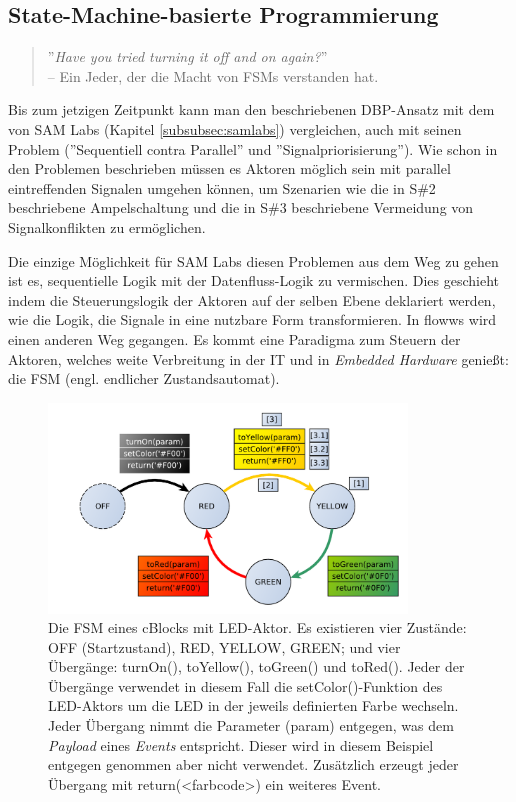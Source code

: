 \subsection{State-Machine-basierte Programmierung}\label{subsec:fsmprogrammierung}
\begin{quote}
    ''\textit{Have you tried turning it off and on again?}''  \\ -- Ein Jeder, der die Macht von \acp{FSM} verstanden hat.
\end{quote}

Bis zum jetzigen Zeitpunkt kann man den beschriebenen \ac{DBP}-Ansatz mit dem von SAM Labs (Kapitel \ref{subsubsec:samlabs}) vergleichen, auch mit seinen Problem (''Sequentiell contra Parallel'' und ''Signalpriorisierung''). Wie schon in den Problemen beschrieben müssen es Aktoren möglich sein mit parallel eintreffenden Signalen umgehen können, um Szenarien wie die in S\#2 beschriebene Ampelschaltung und die in S\#3 beschriebene Vermeidung von Signalkonflikten zu ermöglichen.

Die einzige Möglichkeit für SAM Labs diesen Problemen aus dem Weg zu gehen ist es, sequentielle Logik mit der Datenfluss-Logik zu vermischen. Dies geschieht indem die Steuerungslogik der Aktoren auf der selben Ebene deklariert werden, wie die Logik, die Signale in eine nutzbare Form transformieren. In flowws wird einen anderen Weg gegangen. Es kommt eine Paradigma zum Steuern der Aktoren, welches weite Verbreitung in der IT und in \textit{Embedded Hardware} genießt: die \acl{FSM} (engl. endlicher Zustandsautomat).


\begin{figure}[h]
  \centering
  \includegraphics[width=0.85\textwidth]{bilder/chapter4/chapter4_2/beispielstatemachine.pdf}
  \caption{Die \ac{FSM} eines cBlocks mit LED-Aktor. Es existieren vier Zustände: OFF (Startzustand), RED, YELLOW, GREEN; und vier Übergänge: turnOn(), toYellow(), toGreen() und toRed(). Jeder der Übergänge verwendet in diesem Fall die setColor()-Funktion des LED-Aktors um die LED in der jeweils definierten Farbe wechseln. Jeder Übergang nimmt die Parameter (param) entgegen, was dem \textit{Payload} eines \textit{Events} entspricht. Dieser wird in diesem Beispiel entgegen genommen aber nicht verwendet. Zusätzlich erzeugt jeder Übergang mit return(<farbcode>) ein weiteres Event.}
  \label{fig:beispielfsm}
\end{figure}
 
